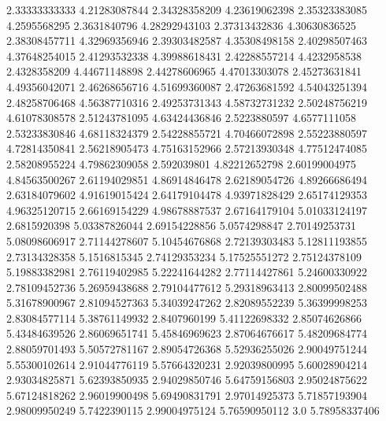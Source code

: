   2.33333333333    4.21283087844
  2.34328358209    4.23619062398
  2.35323383085     4.2595568295
   2.3631840796    4.28292943103
  2.37313432836    4.30630836525
  2.38308457711    4.32969356946
  2.39303482587    4.35308498158
  2.40298507463    4.37648254015
  2.41293532338    4.39988618431
  2.42288557214     4.4232958538
   2.4328358209    4.44671148898
  2.44278606965    4.47013303078
  2.45273631841    4.49356042071
  2.46268656716    4.51699360087
  2.47263681592    4.54043251394
  2.48258706468    4.56387710316
  2.49253731343    4.58732731232
  2.50248756219    4.61078308578
  2.51243781095    4.63424436846
   2.5223880597     4.6577111058
  2.53233830846    4.68118324379
  2.54228855721    4.70466072898
  2.55223880597    4.72814350841
  2.56218905473    4.75163152966
  2.57213930348    4.77512474085
  2.58208955224    4.79862309058
    2.592039801    4.82212652798
  2.60199004975    4.84563500267
  2.61194029851    4.86914846478
  2.62189054726    4.89266686494
  2.63184079602    4.91619015424
  2.64179104478    4.93971828429
  2.65174129353    4.96325120715
  2.66169154229    4.98678887537
  2.67164179104    5.01033124197
   2.6815920398    5.03387826044
  2.69154228856     5.0574298847
  2.70149253731    5.08098606917
  2.71144278607    5.10454676868
  2.72139303483    5.12811193855
  2.73134328358     5.1516815345
  2.74129353234    5.17525551272
  2.75124378109    5.19883382981
  2.76119402985    5.22241644282
  2.77114427861    5.24600330922
  2.78109452736    5.26959438688
  2.79104477612    5.29318963413
  2.80099502488    5.31678900967
  2.81094527363    5.34039247262
  2.82089552239    5.36399998253
  2.83084577114    5.38761149932
   2.8407960199    5.41122698332
  2.85074626866    5.43484639526
  2.86069651741    5.45846969623
  2.87064676617    5.48209684774
  2.88059701493    5.50572781167
  2.89054726368    5.52936255026
  2.90049751244    5.55300102614
  2.91044776119    5.57664320231
  2.92039800995    5.60028904214
  2.93034825871    5.62393850935
  2.94029850746    5.64759156803
  2.95024875622    5.67124818262
  2.96019900498    5.69490831791
  2.97014925373    5.71857193904
  2.98009950249     5.7422390115
  2.99004975124    5.76590950112
            3.0    5.78958337406
